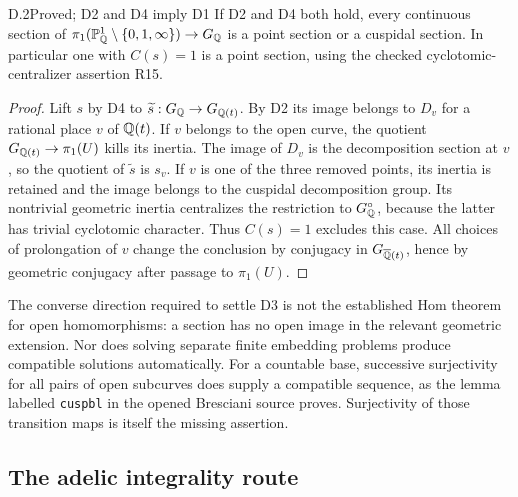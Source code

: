 \begin{claim}{D.2}{Proved; D2 and D4 imply D1}
If D2 and D4 both hold, every continuous section of
$\pi_1(\mathbb P^1_\mathbb Q\setminus\{0,1,\infty\})\to G_\mathbb Q$ is a point
section or a cuspidal section. In particular one with $C(s)=1$ is a
point section, using the checked cyclotomic-centralizer assertion R15.
\end{claim}
\begin{proof}
Lift $s$ by D4 to $\widetilde s:G_\mathbb Q\to G_{\mathbb Q(t)}$.
By D2 its image belongs to $D_v$ for a rational place $v$ of
$\mathbb Q(t)$. If $v$ belongs to the open curve, the quotient
$G_{\mathbb Q(t)}\to\pi_1(U)$ kills its inertia. The image of $D_v$ is
the decomposition section at $v$, so the quotient of
$\widetilde s$ is $s_v$. If $v$ is one of the three removed
points, its inertia is retained and the image belongs to the
cuspidal decomposition group. Its nontrivial geometric inertia
centralizes the restriction to $G_\mathbb Q^\circ$, because the latter
has trivial cyclotomic character. Thus $C(s)=1$ excludes this case.
All choices of prolongation of $v$ change the conclusion by
conjugacy in $G_{\overline{\mathbb Q}(t)}$, hence by geometric conjugacy
after passage to $\pi_1(U)$.
\end{proof}

The converse direction required to settle D3 is not the established
Hom theorem for open homomorphisms: a section has no open image in
the relevant geometric extension. Nor does solving separate finite
embedding problems produce compatible solutions automatically.
For a countable base, successive surjectivity for all pairs of open
subcurves does supply a compatible sequence, as the lemma labelled
\texttt{cuspbl} in the opened Bresciani source proves. Surjectivity
of those transition maps is itself the missing assertion.

\subsection{The adelic integrality route}

